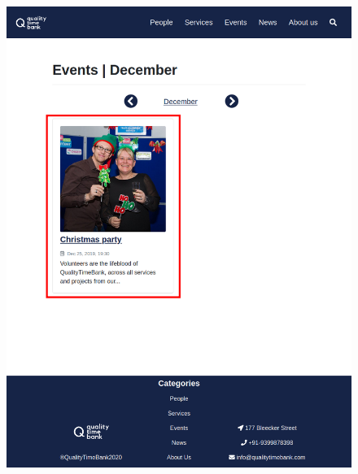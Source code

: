 \documentclass[a4paper, 11pt, parskip=half, headsepline]{scrreprt}
\begin{document}
\begin{figure}[H]
    \begin{minipage}[t]{0.5\textwidth}
        \centering
    	\includegraphics[width=1\linewidth, keepaspectratio]{scenarios/scenario-33}
    	\caption{}
    	\label{fig:scenario-33}
    \end{minipage}
    \hspace*{\fill}
    \begin{minipage}[t]{0.5\textwidth}
        \centering

\end{minipage}
\end{figure}
\end{document}
